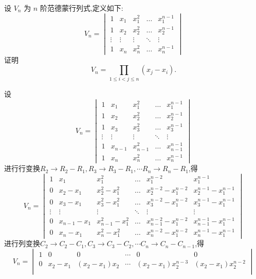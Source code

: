 \begin{questions}
    \question 设 $V_n$ 为 $n$ 阶范德蒙行列式,定义如下:
    \[
    V_n = \begin{vmatrix}
    1 & x_1 & x_1^2 & \dots & x_1^{n-1} \\
    1 & x_2 & x_2^2 & \dots & x_2^{n-1} \\
    \vdots & \vdots & \vdots & \ddots & \vdots \\
    1 & x_n & x_n^2 & \dots & x_n^{n-1}
    \end{vmatrix}
    \]
    证明
    \[
    V_n = \prod_{1 \le i < j \le n} (x_j - x_i).
    \]
    \begin{solution}
        设
        \[
        V_n = \begin{vmatrix}
        1 & x_1 & x_1^2 & \dots & x_1^{n-1} \\
        1 & x_2 & x_2^2 & \dots & x_2^{n-1} \\
        1 & x_3 & x_3^2 & \dots & x_3^{n-1} \\
        \vdots & \vdots & \vdots & \ddots & \vdots \\
        1 & x_{n-1} & x_{n-1}^2 & \dots & x_{n-1}^{n-1} \\
        1 & x_n & x_n^2 & \dots & x_n^{n-1}
        \end{vmatrix}
        \]
        进行行变换$R_2\rightarrow R_2-R_1,R_3\rightarrow R_3-R_1,\cdots R_n\rightarrow R_n-R_1$,得
        \[
        V_n = \begin{vmatrix}
        1 & x_1 & x_1^2 & \dots & x_1^{n-2} & x_1^{n-1} \\
        0 & x_2-x_1 & x_2^2-x_1^2 & \dots & x_2^{n-2}-x_1^{n-2} & x_2^{n-1}-x_1^{n-1} \\
        0 & x_3-x_1 & x_3^2-x_1^2 & \dots & x_3^{n-2}-x_1^{n-2} & x_3^{n-1}-x_1^{n-1} \\
        \vdots & \vdots & \vdots & \ddots & \vdots & \vdots \\
        0 & x_{n-1}-x_1 & x_{n-1}^2-x_1^2 & \dots & x_{n-1}^{n-2}-x_1^{n-2} & x_{n-1}^{n-1}-x_1^{n-1} \\
        0 & x_n-x_1 & x_n^2-x_1^2 & \dots & x_n^{n-2}-x_1^{n-2} & x_n^{n-1}-x_1^{n-1}
        \end{vmatrix}
        \]
        进行列变换$C_2\rightarrow C_2-C_1,C_3\rightarrow C_3-C_2,\cdots C_n\rightarrow C_n-C_{n-1}$,得
        \[
        V_n =
        \begin{vmatrix}
        1 & 0 & 0 & \cdots & 0 & 0 \\
        0 & x_2-x_1 & (x_2-x_1)x_2 & \cdots & (x_2-x_1)x_2^{n-3} & (x_2-x_1)x_2^{n-2} \\

\end{vmatrix}\]
\end{solution}
\end{questions}
